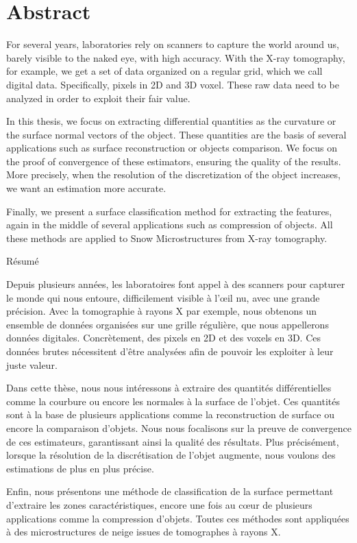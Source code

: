 %
\chapter*{Abstract}
\label{sec:abstract}
\vspace*{-10mm}

For several years, laboratories rely on scanners to capture the world around us,
barely visible to the naked eye, with high accuracy. With the X-ray tomography,
for example, we get a set of data organized on a regular grid, which we call
digital data. Specifically, pixels in 2D and 3D voxel. These raw data need to be
analyzed in order to exploit their fair value.

In this thesis, we focus on extracting differential quantities as the curvature
or the surface normal vectors of the object. These quantities are the basis of
several applications such as surface reconstruction or objects comparison. We
focus on the proof of convergence of these estimators, ensuring the quality of
the results. More precisely, when the resolution of the discretization of the
object increases, we want an estimation more accurate.

Finally, we present a surface classification method for extracting the features,
again in the middle of several applications such as compression of objects. All
these methods are applied to Snow Microstructures from X-ray tomography.

\vspace*{20mm}

{Résumé}
\label{sec:abstract-french}
\vspace*{5mm}

Depuis plusieurs années, les laboratoires font appel à des scanners pour
capturer le monde qui nous entoure, difficilement visible à l’œil nu, avec une
grande précision. Avec la tomographie à rayons X par exemple, nous obtenons un
ensemble de données organisées sur une grille régulière, que nous appellerons
données digitales. Concrètement, des pixels en 2D et des voxels en 3D. Ces
données brutes nécessitent d’être analysées afin de pouvoir les exploiter à leur
juste valeur.

Dans cette thèse, nous nous intéressons à extraire des quantités différentielles
comme la courbure ou encore les normales à la surface de l’objet. Ces quantités
sont à la base de plusieurs applications comme la reconstruction de surface ou
encore la comparaison d’objets. Nous nous focalisons sur la preuve de
convergence de ces estimateurs, garantissant ainsi la qualité des résultats.
Plus précisément, lorsque la résolution de la discrétisation de l’objet
augmente, nous voulons des estimations de plus en plus précise.

Enfin, nous présentons une méthode de classification de la surface permettant
d’extraire les zones caractéristiques, encore une fois au cœur de plusieurs
applications comme la compression d’objets. Toutes ces méthodes sont appliquées à
des microstructures de neige issues de tomographes à rayons X.
